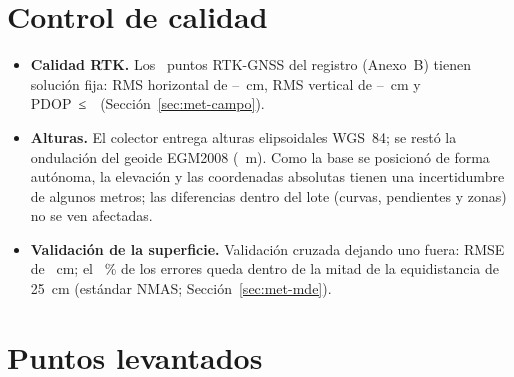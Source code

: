 \documentclass[10pt]{article}
\begin{document}
\appendix
\makeatletter{}\makeatother
\section{Control de calidad}
\begin{itemize}
  \item \textbf{Calidad RTK.} Los \NPuntosTotal\ puntos RTK-GNSS del registro (Anexo~B) tienen solución fija: RMS horizontal de \mbox{\HrmsMin–\HrmsMax}~cm, RMS vertical de \mbox{\VrmsMin–\VrmsMax}~cm y PDOP~≤~\PdopMax\ (Sección~\ref{sec:met-campo}).
  \item \textbf{Alturas.} El colector entrega alturas elipsoidales WGS~84; se restó la ondulación del geoide EGM2008 (\Geoide~m). Como la base se posicionó de forma autónoma, la elevación y las coordenadas absolutas tienen una incertidumbre de algunos metros; las diferencias dentro del lote (curvas, pendientes y zonas) no se ven afectadas.
  \item \textbf{Validación de la superficie.} Validación cruzada dejando uno fuera: RMSE de \RMSE~cm; el \NMASpct~\% de los errores queda dentro de la mitad de la equidistancia de 25~cm (estándar NMAS; Sección~\ref{sec:met-mde}).
\end{itemize}


\clearpage
\section{Puntos levantados}\label{sec:puntos}


\end{document}
